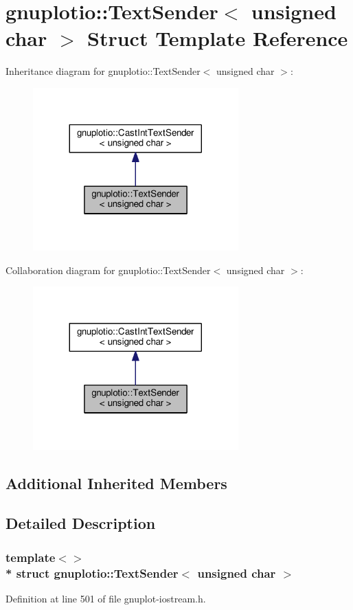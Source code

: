 \hypertarget{structgnuplotio_1_1_text_sender_3_01unsigned_01char_01_4}{}\section{gnuplotio\+:\+:Text\+Sender$<$ unsigned char $>$ Struct Template Reference}
\label{structgnuplotio_1_1_text_sender_3_01unsigned_01char_01_4}


Inheritance diagram for gnuplotio\+:\+:Text\+Sender$<$ unsigned char $>$\+:
\nopagebreak
\begin{figure}[H]
\begin{center}
\leavevmode
\includegraphics[width=224pt]{structgnuplotio_1_1_text_sender_3_01unsigned_01char_01_4__inherit__graph}
\end{center}
\end{figure}


Collaboration diagram for gnuplotio\+:\+:Text\+Sender$<$ unsigned char $>$\+:
\nopagebreak
\begin{figure}[H]
\begin{center}
\leavevmode
\includegraphics[width=224pt]{structgnuplotio_1_1_text_sender_3_01unsigned_01char_01_4__coll__graph}
\end{center}
\end{figure}
\subsection*{Additional Inherited Members}


\subsection{Detailed Description}
\subsubsection*{template$<$$>$\\*
struct gnuplotio\+::\+Text\+Sender$<$ unsigned char $>$}



Definition at line 501 of file gnuplot-\/iostream.\+h.

